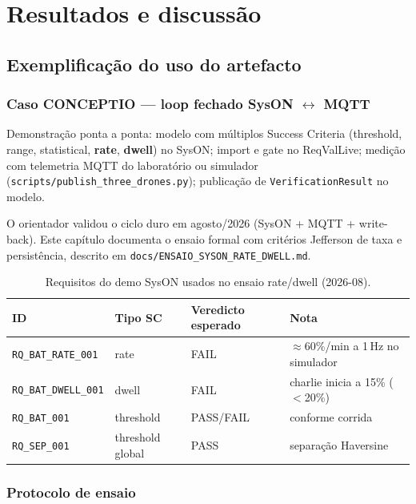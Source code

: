 \chapter{Resultados e discussão}
\label{cap:resultados}

\section{Exemplificação do uso do artefacto}
\label{sec:caso}

\subsection{Caso CONCEPTIO --- loop fechado SysON $\leftrightarrow$ MQTT}

Demonstração ponta a ponta: modelo com múltiplos Success Criteria (threshold,
range, statistical, \textbf{rate}, \textbf{dwell}) no SysON; import e gate no
ReqValLive; medição com telemetria MQTT do laboratório ou simulador
(\texttt{scripts/publish\_three\_drones.py}); publicação de
\texttt{VerificationResult} no modelo.

O orientador validou o ciclo duro em agosto/2026 (SysON + MQTT + write-back).
Este capítulo documenta o ensaio formal com critérios Jefferson de taxa e
persistência, descrito em \texttt{docs/ENSAIO\_SYSON\_RATE\_DWELL.md}.

\begin{table}[htbp]
  \centering
  \caption{Requisitos do demo SysON usados no ensaio rate/dwell (2026-08).}
  \label{tab:ensaio-reqs}
  \begin{tabular}{@{}lllp{4.2cm}@{}}
    \toprule
    ID & Tipo SC & Veredicto esperado & Nota \\
    \midrule
    \texttt{RQ\_BAT\_RATE\_001} & rate & FAIL & $\approx$60\%/min a 1\,Hz no simulador \\
    \texttt{RQ\_BAT\_DWELL\_001} & dwell & FAIL & charlie inicia a 15\% ($<$20\%) \\
    \texttt{RQ\_BAT\_001} & threshold & PASS/FAIL & conforme corrida \\
    \texttt{RQ\_SEP\_001} & threshold global & PASS & separação Haversine \\
    \bottomrule
  \end{tabular}
\end{table}


\subsection{Protocolo de ensaio}

